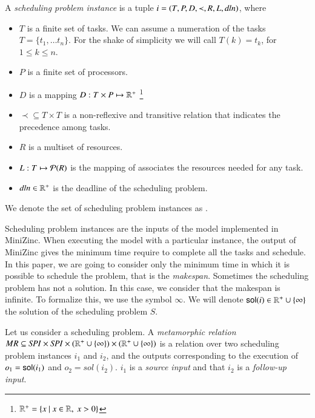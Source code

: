 \begin{definition}
  A \emph{scheduling problem instance} is a tuple $i=(T, P, D, \prec, R, L, \mathit{dln})$, where
  \begin{itemize}
  \item $T$ is a finite set of tasks. We can assume a numeration of
    the tasks $T=\{t_{1},\ldots t_{n}\}$. For the shake of simplicity
    we will call $T(k)=t_{k}$, for $1\leq k\leq n$.
  \item $P$ is a finite set of processors.
  \item $D$ is a mapping $D:T\times P\mapsto \mathbb{R}^{+}$
    \footnote{$\real^{+}=\{x\ |\ x\in\real,\ x>0\}$}
  \item $\prec\subseteq T\times T$ is a non-reflexive and transitive relation that
    indicates the precedence among tasks.
  \item $R$ is a multiset of resources.
  \item $L: T\mapsto{\cal P}(R)$ is the mapping of associates the
    resources needed for any task.
  \item $\mathit{dln}\in\mathbb{R}^{+}$ is the deadline of the scheduling problem.
  \end{itemize}
  We denote the set of scheduling problem instances as \SPI.
\end{definition}


Scheduling problem instances are the inputs of the model implemented
in MiniZinc. When executing the model with a particular instance, the
output of MiniZinc gives the minimum time require to complete all the
tasks and schedule.
In this paper, we are going to
consider only the minimum time in which it is possible to
schedule the problem, that is the \emph{makespan}. Sometimes the
scheduling problem has not a solution. In this case, we consider that
the makespan is infinite. To formalize this, we use
the symbol $\infty$. We will denote
$\mathsf{sol}(i)\in\mathbb{R}^{+}\cup\{\infty\}$\footnotemark the solution of the scheduling
problem $S$.


\begin{definition}
Let us consider a scheduling problem.
A \emph{metamorphic relation}  $MR\subseteq\mathit{SPI}\times\mathit{SPI}\times(\mathbb{R}^{+}\cup\{\infty\})\times(\mathbb{R}^{+}\cup\{\infty\})$
is a relation over two
scheduling problem instances $i_1$ and $i_2$, and the outputs
corresponding
to the execution of $o_{1}=\mathsf{sol}(i_1)$ and $o_{2}=sol(i_2)$.
$i_1$ is a \emph{source input} and that $i_2$ is a \emph{follow-up input}.
\end{definition}

